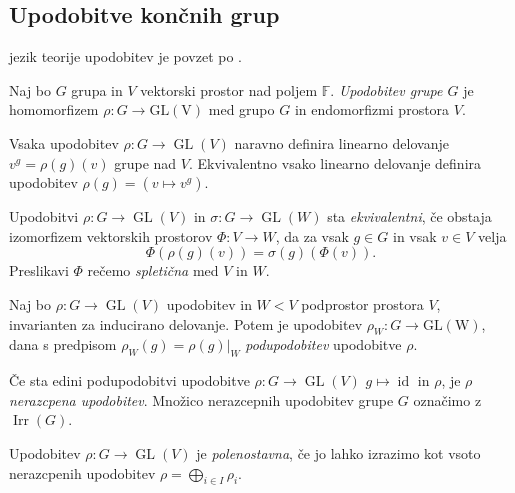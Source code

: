 \documentclass[mat2, tisk]{fmfdelo}
\begin{document}
    \subsection{Upodobitve končnih grup}
    \label{subsection:upodobitve končnih grup}
    jezik teorije upodobitev je povzet po \cite{jezernik2025upodobitve}.
    \begin{definicija}
      Naj bo $G$ grupa in $V$ vektorski prostor nad poljem
      $\mathbb{F}$. \emph{Upodobitev grupe $G$} je homomorfizem $
      \rho \colon G \to \operatorname{GL(V)}$ med grupo $G$ in
      endomorfizmi prostora $V$.
    \end{definicija}
    Vsaka upodobitev $\rho \colon G \to \operatorname{GL}(V)$ naravno
    definira linearno delovanje $v ^ g = \rho(g)(v)$ grupe nad $V$.
    Ekvivalentno vsako linearno delovanje  definira upodobitev
    $\rho(g) = (v \mapsto v^g)$.
    \begin{definicija}
      Upodobitvi $\rho \colon G \to \operatorname{GL}(V)$ in
      $\sigma \colon G \to \operatorname{GL}(W)$ sta
      \emph{ekvivalentni}, če obstaja izomorfizem vektorskih
      prostorov $\Phi \colon  V \to W$, da za vsak $g \in G$ in vsak
      $v \in V$ velja
      $$
      \Phi(\rho(g)(v)) = \sigma(g)(\Phi(v)).
      $$
      Preslikavi $\Phi$ rečemo \emph{spletična} med $V$ in $W$.
    \end{definicija}
    \begin{definicija}
      Naj bo $\rho: G \to \operatorname{GL}(V)$ upodobitev in $W < V$
      podprostor prostora $V$, invarianten za inducirano delovanje.
      Potem je upodobitev
      $
      \rho_W \colon G \to \operatorname{GL(W)}
      $, dana s predpisom
      $\rho_W(g) = \rho(g)|_{W}$ \emph{podupodobitev} upodobitve $\rho$.
    \end{definicija}
    \begin{definicija}
      Če sta edini podupodobitvi upodobitve $\rho \colon G \to
      \operatorname{GL}(V)$ $g \mapsto \operatorname{id}$ in $\rho$,
      je $\rho$ \emph{nerazcpena upodobitev}.
      Množico nerazcepnih upodobitev grupe $G$ označimo z
      $\operatorname{Irr}(G)$.
    \end{definicija}
    \begin{definicija}
      Upodobitev $\rho \colon G \to \operatorname{GL}(V)$ je
      \emph{polenostavna}, če jo lahko izrazimo kot vsoto nerazcpenih
      upodobitev $\rho = \bigoplus _{i \in I} \rho_i$.
    \end{definicija}
\end{document}
